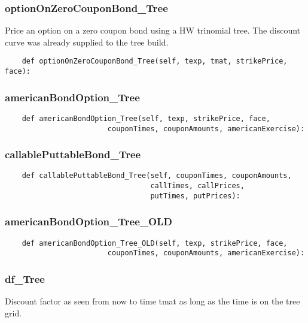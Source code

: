\documentclass[twoside,11pt]{book}
\begin{document}
\subsubsection*{{\bf optionOnZeroCouponBond\_Tree}}
Price an option on a zero coupon bond using a HW trinomial tree. The discount curve was already supplied to the tree build.  

\begin{lstlisting}
    def optionOnZeroCouponBond_Tree(self, texp, tmat, strikePrice, face):
\end{lstlisting}

\subsubsection*{{\bf americanBondOption\_Tree}}


\begin{lstlisting}
    def americanBondOption_Tree(self, texp, strikePrice, face,
                        couponTimes, couponAmounts, americanExercise):
\end{lstlisting}

\subsubsection*{{\bf callablePuttableBond\_Tree}}


\begin{lstlisting}
    def callablePuttableBond_Tree(self, couponTimes, couponAmounts,
                                  callTimes, callPrices,
                                  putTimes, putPrices):
\end{lstlisting}

\subsubsection*{{\bf americanBondOption\_Tree\_OLD}}


\begin{lstlisting}
    def americanBondOption_Tree_OLD(self, texp, strikePrice, face,
                        couponTimes, couponAmounts, americanExercise):
\end{lstlisting}

\subsubsection*{{\bf df\_Tree}}
Discount factor as seen from now to time tmat as long as the time is on the tree grid.  
\end{document}
